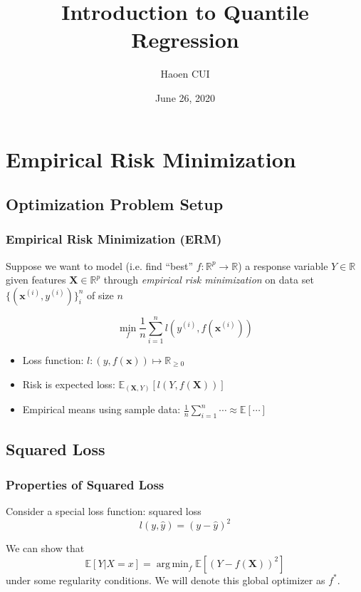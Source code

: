 \documentclass{beamer}
\title[Introduction to Quantile Regression]{Introduction to Quantile Regression} %
\author{Haoen CUI} %
\institute[Uptake] %
{
Uptake Math Club Lightning Talk \\
\href{http://www.sharelatex.com}{Code Repository: github.com/haoen-cui/}
}
\date{June 26, 2020}
\DeclareMathOperator*{\argmin}{arg\,min}
\begin{document}
\begin{frame}
\titlepage %
\end{frame}


\section{Empirical Risk Minimization}

\subsection{Optimization Problem Setup}

\begin{frame}
\frametitle{Empirical Risk Minimization (ERM)}

Suppose we want to model (i.e. find ``best'' $f: \mathbb{R}^p \rightarrow \mathbb{R}$) a response variable $Y \in \mathbb{R}$ given features $\boldsymbol{X} \in \mathbb{R}^p$ through \textit{empirical risk minimization} on data set $\{(\boldsymbol{x}^{(i)}, y^{(i)})\}_i^n$ of size $n$

$$
\min_{f} \frac{1}{n} \sum_{i=1}^{n} l(y^{(i)}, f(\boldsymbol{x}^{(i)}))
$$

\begin{itemize}
    \item Loss function: $l: (y, f(\boldsymbol{x})) \mapsto \mathbb{R}_{\geq 0}$
    \item Risk is expected loss: $\mathbb{E}_{(\boldsymbol{X}, Y)}[l(Y, f(\boldsymbol{X}))]$
    \item Empirical means using sample data: $\frac{1}{n}\sum_{i=1}^{n} \cdots \approx \mathbb{E}[\cdots]$
\end{itemize}

\end{frame}


\subsection{Squared Loss}

\begin{frame}
\frametitle{Properties of Squared Loss}

Consider a special loss function: \alert{squared loss}
$$
l(y, \hat{y}) = (y - \hat{y})^2
$$

We can show that
$$
\mathbb{E}[Y| X = x] = \argmin_{f} \mathbb{E}[(Y - f(\boldsymbol{X}))^2]
$$
under some regularity conditions. We will denote this global optimizer as $f^{*}$.


\end{frame}
\end{document}
